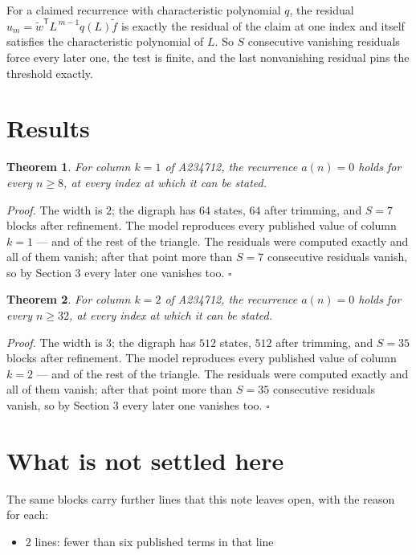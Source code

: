 \documentclass[11pt]{article}
\newtheorem{theorem}{Theorem}
\theoremstyle{definition}
\begin{document}
For a claimed recurrence with characteristic polynomial $q$, the residual $u_m = \tilde w^{\mathsf T}L^{\,m-1}q(L)\tilde f$ is exactly the residual of the claim at one index and itself satisfies the characteristic polynomial of $L$. So $S$ consecutive vanishing residuals force every later one, the test is finite, and the last nonvanishing residual pins the threshold exactly.

\section{Results}

\begin{theorem} For column $k = 1$ of A234712, the recurrence $a(n) = 0$ holds for every $n \ge 8$, at every index at which it can be stated.\end{theorem}

{\itshape Proof.} The width is $2$; the digraph has $64$ states, $64$ after trimming, and $S = 7$ blocks after refinement. The model reproduces every published value of column $k = 1$ --- and of the rest of the triangle. The residuals were computed exactly and all of them vanish; after that point more than $S = 7$ consecutive residuals vanish, so by Section 3 every later one vanishes too. $\square$

\begin{theorem} For column $k = 2$ of A234712, the recurrence $a(n) = 0$ holds for every $n \ge 32$, at every index at which it can be stated.\end{theorem}

{\itshape Proof.} The width is $3$; the digraph has $512$ states, $512$ after trimming, and $S = 35$ blocks after refinement. The model reproduces every published value of column $k = 2$ --- and of the rest of the triangle. The residuals were computed exactly and all of them vanish; after that point more than $S = 35$ consecutive residuals vanish, so by Section 3 every later one vanishes too. $\square$

\section{What is not settled here}

The same blocks carry further lines that this note leaves open, with the reason for each:

\begin{itemize}

\item 2 lines: fewer than six published terms in that line

\end{itemize}
\end{document}
